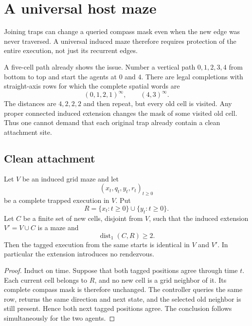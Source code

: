 \section{A universal host maze}\label{sec:universal-host}
\label{subsec:universal-host-construction}

Joining traps can change a queried compass mask even when the new edge was never
traversed. A universal induced maze therefore requires protection of the entire
execution, not just its recurrent edges.

A five-cell path already shows the issue.  Number a vertical path $0,1,2,3,4$ from
bottom to top and start the agents at $0$ and $4$.  There are legal completions with
straight-axis rows for which the complete spatial words are
\[
  (0,1,2,1)^\infty,
  \qquad
  (4,3)^\infty.
\]
The distances are $4,2,2,2$ and then repeat, but every old cell is visited.  Any proper
connected induced extension changes the mask of some visited old cell.  Thus one
cannot demand that each original trap already contain a clean attachment site.

\subsection{Clean attachment}
\label{subsubsec:clean-attachment}

\begin{lemma}
\label{lem:clean-attachment}
Let $V$ be an induced grid maze and let
\[
  (x_t,q_t,y_t,r_t)_{t\ge0}
\]
be a complete trapped execution in $V$.  Put
\[
  R=\{x_t:t\ge0\}\cup\{y_t:t\ge0\}.
\]
Let $C$ be a finite set of new cells, disjoint from $V$, such that the induced extension
$V'=V\cup C$ is a maze and
\[
  \operatorname{dist}_1(C,R)\ge2.
\]
Then the tagged execution from the same starts is identical in $V$ and $V'$.
In particular the extension introduces no rendezvous.
\end{lemma}

\begin{proof}
Induct on time.  Suppose that both tagged positions agree through time $t$.  Each
current cell belongs to $R$, and no new cell is a grid neighbor of it.  Its complete
compass mask is therefore unchanged.  The controller queries the same row, returns the
same direction and next state, and the selected old neighbor is still present.  Hence
both next tagged positions agree.  The conclusion follows simultaneously for the two
agents.
\end{proof}

